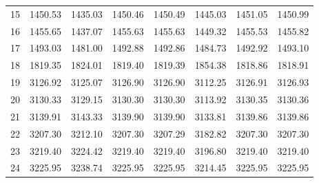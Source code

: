 \documentclass[10pt,oneside]{article}
\begin{document}
\begin{table}[h!]
\begin{tabular}{cccccccc}
15 &   1450.53 & 1435.03 & 1450.46 &    1450.49 &      1445.03 & 1451.05 &   1450.99 \\
16 &   1455.65 & 1437.07 & 1455.63 &    1455.63 &      1449.32 & 1455.53 &   1455.82 \\
17 &   1493.03 & 1481.00 & 1492.88 &    1492.86 &      1484.73 & 1492.92 &   1493.10 \\
18 &   1819.35 & 1824.01 & 1819.40 &    1819.39 &      1854.38 & 1818.86 &   1818.91 \\
19 &   3126.92 & 3125.07 & 3126.90 &    3126.90 &      3112.25 & 3126.91 &   3126.93 \\
20 &   3130.33 & 3129.15 & 3130.30 &    3130.30 &      3113.92 & 3130.35 &   3130.36 \\
21 &   3139.91 & 3143.33 & 3139.90 &    3139.90 &      3133.81 & 3139.86 &   3139.86 \\
22 &   3207.30 & 3212.10 & 3207.30 &    3207.29 &      3182.82 & 3207.30 &   3207.30 \\
23 &   3219.40 & 3224.42 & 3219.40 &    3219.40 &      3196.80 & 3219.40 &   3219.40 \\
24 &   3225.95 & 3238.74 & 3225.95 &    3225.95 &      3214.45 & 3225.95 &   3225.95 \\
\bottomrule
\end{tabular}
\end{table}
\end{document}
